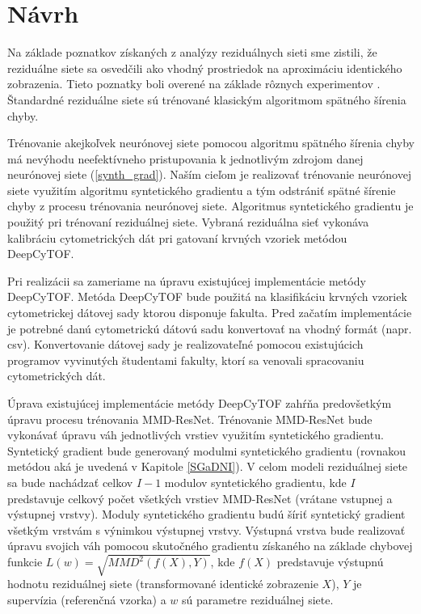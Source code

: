 \chapter{Návrh}  %

Na základe poznatkov získaných z analýzy reziduálnych sieti sme zistili, že reziduálne siete sa osvedčili ako vhodný prostriedok na aproximáciu identického zobrazenia. Tieto poznatky boli overené na základe rôznych experimentov \cite{Targ2016, He2016, Wu2017}. Štandardné reziduálne siete sú trénované klasickým algoritmom spätného šírenia chyby.

Trénovanie akejkoľvek neurónovej siete pomocou algoritmu spätného šírenia chyby má nevýhodu neefektívneho pristupovania k jednotlivým zdrojom danej neurónovej siete (\ref{synth_grad}). Naším cieľom je realizovať trénovanie neurónovej siete využitím algoritmu syntetického gradientu a tým odstrániť spätné šírenie chyby z procesu trénovania neurónovej siete. Algoritmus syntetického gradientu je použitý pri trénovaní reziduálnej siete. Vybraná reziduálna sieť vykonáva kalibráciu cytometrických dát pri gatovaní krvných vzoriek metódou DeepCyTOF.

Pri realizácii sa zameriame na úpravu existujúcej implementácie metódy DeepCyTOF. Metóda DeepCyTOF bude použitá na klasifikáciu krvných vzoriek cytometrickej dátovej sady ktorou disponuje fakulta. Pred začatím implementácie je potrebné danú cytometrickú dátovú sadu konvertovať na vhodný formát (napr. csv). Konvertovanie dátovej sady je realizovateľné pomocou existujúcich programov vyvinutých študentami fakulty, ktorí sa venovali spracovaniu cytometrických dát.

Úprava existujúcej implementácie metódy DeepCyTOF zahŕňa predovšetkým úpravu procesu trénovania MMD-ResNet. Trénovanie MMD-ResNet bude vykonávať úpravu váh jednotlivých vrstiev využitím syntetického gradientu. Syntetický gradient bude generovaný modulmi syntetického gradientu (rovnakou metódou aká je uvedená v Kapitole \ref{SGaDNI}). V celom modeli reziduálnej siete sa bude nachádzať celkov $I-1$ modulov syntetického gradientu, kde $I$ predstavuje celkový počet všetkých vrstiev MMD-ResNet (vrátane vstupnej a výstupnej vrstvy). Moduly syntetického gradientu budú šíriť syntetický gradient všetkým vrstvám s výnimkou výstupnej vrstvy. Výstupná vrstva bude realizovať úpravu svojich váh pomocou skutočného gradientu získaného na základe chybovej funkcie $L(w) = \sqrt{MMD^2(f(X),Y)}$, kde $f(X)$ predstavuje výstupnú hodnotu reziduálnej siete (transformované identické zobrazenie $X$), $Y$ je supervízia (referenčná vzorka) a $w$ sú parametre reziduálnej siete.

